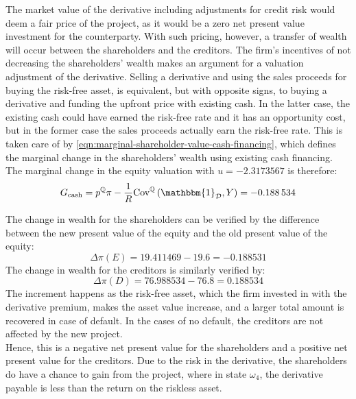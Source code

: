 \documentclass[main.tex]{subfiles}
\begin{document}
            The market value of the derivative including adjustments for credit risk would deem a fair price of the project,
            as it would be a zero net present value investment for the counterparty.
            With such pricing, however, a transfer of wealth will occur between the shareholders and the creditors.
            The firm's incentives of not decreasing the shareholders' wealth
            makes an argument for a valuation adjustment of the derivative.
            Selling a derivative and using the sales proceeds for buying the risk-free asset,
            is equivalent, but with opposite signs,
            to buying a derivative and funding the upfront price with existing cash.
            In the latter case, the existing cash could have earned the risk-free rate
            and it has an opportunity cost,
            but in the former case the sales proceeds actually earn the risk-free rate.
            This is taken care of by \cref{eqn:marginal-shareholder-value-cash-financing},
            which defines the marginal change in the shareholders' wealth using existing cash financing.
            \\
            The marginal change in the equity valuation with $u=\num{-2.3173567}$ is therefore:
            \begin{equation}
                G_{\text{cash}} = p^{\rnmeasure}\pi
                -\discountfactor \text{Cov}^{\rnmeasure}\left(\mathbbm{1}_{\mathcal{D}},Y\right) = \num{-0.188534}
            \end{equation}

            The change in wealth for the shareholders can be verified by the difference between the new present value of the equity and the old present value of the equity:
            \begin{equation}
                \Delta \pi(E) = \num{19.411469} - \num{19.6} = \num{-0.188531}
            \end{equation}
            The change in wealth for the creditors is similarly verified by:
            \begin{equation}
                \Delta \pi(D) = \num{76.988534} - \num{76.8} = \num{0.188534}
            \end{equation}
            The increment happens as the risk-free asset, which the firm invested in with the derivative premium, 
            makes the asset value increase, and a larger total amount is recovered in case of default. 
            In the cases of no default, the creditors are not affected by the new project.
            \\
            Hence, this is a negative net present value for the shareholders 
            and a positive net present value for the creditors. 
            Due to the risk in the derivative, the shareholders do have a chance to gain from the project, 
            where in state $\omega_4$, the derivative payable is less than the return on the riskless asset.
\end{document}
